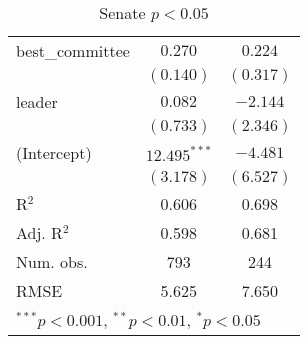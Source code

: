 \documentclass[12pt]{article}
\begin{document}
\begin{table}
\begin{center}
\begin{tabular}{l c c }
			best\_committee        & $0.270$        & $0.224$       \\
			& $(0.140)$      & $(0.317)$     \\
			leader                 & $0.082$        & $-2.144$      \\
			& $(0.733)$      & $(2.346)$     \\
			(Intercept)            & $12.495^{***}$ & $-4.481$      \\
			& $(3.178)$      & $(6.527)$     \\
			\hline
			R$^2$                  & 0.606          & 0.698         \\
			Adj. R$^2$             & 0.598          & 0.681         \\
			Num. obs.              & 793            & 244           \\
			RMSE                   & 5.625          & 7.650         \\
			\hline
			\multicolumn{3}{l}{\scriptsize{$^{***}p<0.001$, $^{**}p<0.01$, $^*p<0.05$}}
		\end{tabular}
		\caption{Senate $ p < 0.05 $}
	\end{center}
\end{table}
\end{document}
